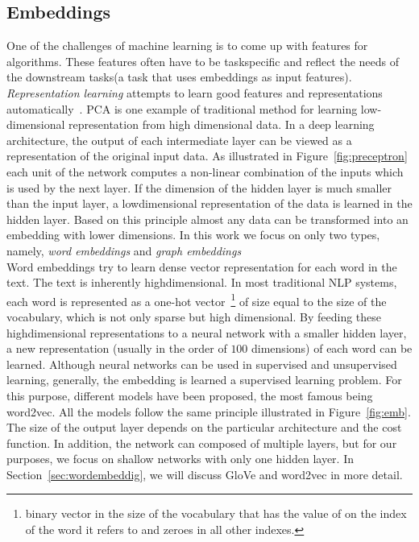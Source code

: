\subsection{Embeddings}\label{subsec:embeddings}
One of the challenges of machine learning is to come up with  features for algorithms. These features often have to be task\added{-}specific and reflect the needs of the downstream tasks(a task that uses embeddings as input features). \emph{Representation learning} attempts to learn good features and representations automatically~. PCA is one example of  traditional method for learning low-dimensional representation from high dimensional data. In a deep learning architecture, the output of each intermediate layer can be viewed as a representation of the original input data. As illustrated in Figure~\ref{fig:preceptron} each unit of the network computes a non-linear combination of the inputs which is used by the next layer. If the dimension of the hidden layer is much smaller than the input layer, a low\added{-}dimensional representation of the data is learned in the hidden layer. Based on this principle almost any data can be transformed into an embedding with lower dimensions. In this work we focus on only two types, namely, \emph{word embeddings} and  \emph{graph embeddings} \\
\noindent
Word embeddings try to learn  dense vector representation for each word in the text.
The text is inherently high\added{-}dimensional.
In most traditional NLP systems, each word is represented as a one-hot vector~\footnote{ binary vector in the size of the vocabulary that has the value of  on the index of the word it refers to and zeroes in all other indexes.} of size equal to the size of the vocabulary, which is not only sparse but high dimensional.
By feeding these high\added{-}dimensional representations to a neural network with a smaller hidden layer, a new representation (usually in the order of $100$ dimensions) of each word can be learned. Although neural networks can be used in supervised and unsupervised learning, generally, the embedding is learned  a supervised learning problem. For this purpose, different models have been proposed, the most famous being word2vec. All the models follow the same principle illustrated in Figure~\ref{fig:emb}. The size of the output layer depends on the particular architecture and the cost function. In addition, the network can  composed of multiple layers, but for our purposes, we focus on shallow networks with only one hidden layer. In Section~\ref{sec:wordembeddig}, we will discuss GloVe and word2vec in more detail. \\
